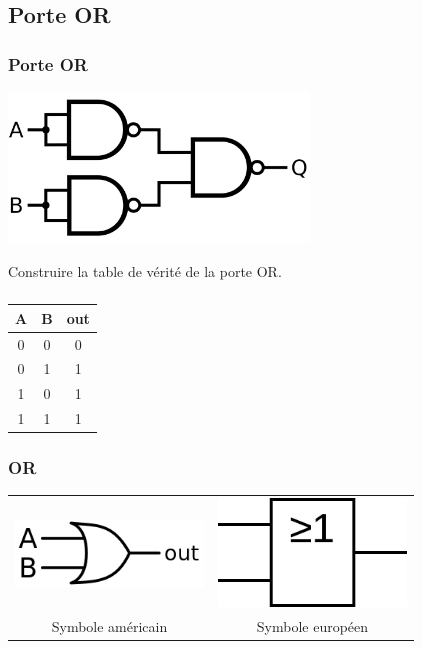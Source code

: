 \documentclass[svgnames,11pt]{beamer}
\begin{document}
\subsection{Porte OR}
\begin{frame}
    \frametitle{Porte OR}

    \begin{center}
        \centering
        \includegraphics[width=8cm]{ressources/or-from-nand.png}
    \end{center}
    \begin{activite}
        Construire la table de vérité de la porte OR.
    \end{activite}
\end{frame}
\begin{frame}
    \frametitle{}
    \begin{center}
        \begin{tabular}{|c|c|c|}
            \hline
            A & B & out \\
            \hline
            0 & 0 & 0   \\
            \hline
            0 & 1 & 1   \\
            \hline
            1 & 0 & 1   \\
            \hline
            1 & 1 & 1   \\
            \hline
        \end{tabular}
    \end{center}

\end{frame}
\begin{frame}
    \frametitle{OR}
    \begin{tabular}{cc}
        \includegraphics[width=5cm]{ressources/or-us.png}
                          &
        \includegraphics[width=5cm]{ressources/or-eu.png}
        \\
        Symbole américain & Symbole européen \\
    \end{tabular}


\end{frame}
\end{document}
